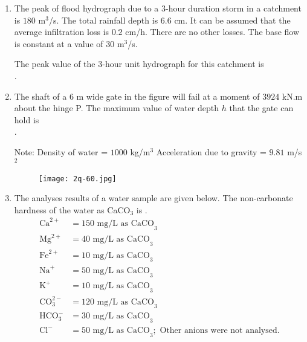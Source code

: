 \documentclass[journal,12pt,onecolumn]{article}
\theoremstyle{remark}
\begin{document}
\begin{enumerate}
    \hfill{}
    
    \item The peak of flood hydrograph due to a $3$-hour duration storm in a catchment is $180$ m$^3$/s. The total rainfall depth is $6.6$ cm. It can be assumed that the average infiltration loss is $0.2$ cm/h. There are no other losses. The base flow is constant at a value of $30$ m$^3$/s.
    
    The peak value of the $3$-hour unit hydrograph for this catchment  is \underline{\hspace{2cm}} \\ .
    
    \hfill{}
    
    \item The shaft of a $6$ m wide gate in the figure  will fail at a moment of $3924$ kN.m about the hinge P. The maximum value of water depth $h$  that the gate can hold is \underline{\hspace{2cm}} \\ .
    
    Note:
    Density of water = $1000$ kg/m$^3$
    Acceleration due to gravity = $9.81$ m/s$^2$
    \begin{figure}[H]
        \centering
        \texttt{[image: 2q-60.jpg]}
        \caption{}
        \label{fig:q60}
    \end{figure}
    
    \hfill{}
    
    \item The analyses results of a water sample are given below. The non-carbonate hardness of the water  as CaCO$_3$ is \underline{\hspace{2cm}} .
    \begin{align*}
        \text{Ca}^{2+} &= 150 \text{ mg/L as CaCO}_3 \\
        \text{Mg}^{2+} &= 40 \text{ mg/L as CaCO}_3 \\
        \text{Fe}^{2+} &= 10 \text{ mg/L as CaCO}_3 \\
        \text{Na}^{+} &= 50 \text{ mg/L as CaCO}_3 \\
        \text{K}^{+} &= 10 \text{ mg/L as CaCO}_3 \\
        \text{CO}_3^{2-} &= 120 \text{ mg/L as CaCO}_3 \\
        \text{HCO}_3^{-} &= 30 \text{ mg/L as CaCO}_3 \\
        \text{Cl}^{-} &= 50 \text{ mg/L as CaCO}_3; \text{ Other anions were not analysed.}
    \end{align*}
    

\end{enumerate}
\end{document}
